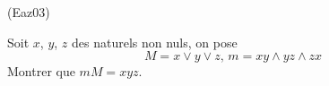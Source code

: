 \begin{tiny}(Eaz03)\end{tiny} Soit $x$, $y$, $z$ des naturels non nuls, on pose
\[M=x\vee y\vee z,\, m=xy\wedge yz\wedge zx\]
Montrer que $mM=xyz$.